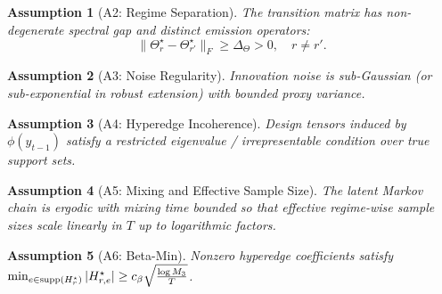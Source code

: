 \documentclass[11pt]{article}
\newtheorem{assumption}{Assumption}
\begin{document}
\begin{assumption}[A2: Regime Separation]
The transition matrix has non-degenerate spectral gap and distinct emission operators:
\[
\|\Theta_r^\star - \Theta_{r'}^\star\|_F \ge \Delta_\Theta > 0,\quad
r \neq r'.
\]
\end{assumption}

\begin{assumption}[A3: Noise Regularity]
Innovation noise is sub-Gaussian (or sub-exponential in robust extension) with bounded
proxy variance.
\end{assumption}

\begin{assumption}[A4: Hyperedge Incoherence]
Design tensors induced by $\phi(y_{t-1})$ satisfy a restricted eigenvalue / irrepresentable
condition over true support sets.
\end{assumption}

\begin{assumption}[A5: Mixing and Effective Sample Size]
The latent Markov chain is ergodic with mixing time bounded so that effective regime-wise
sample sizes scale linearly in $T$ up to logarithmic factors.
\end{assumption}

\begin{assumption}[A6: Beta-Min]
Nonzero hyperedge coefficients satisfy
$\min_{e \in {\rm supp}(H_r^\star)} |H_{r,e}^\star| \ge c_\beta \sqrt{\frac{\log M_3}{T}}$.
\end{assumption}
\end{document}

